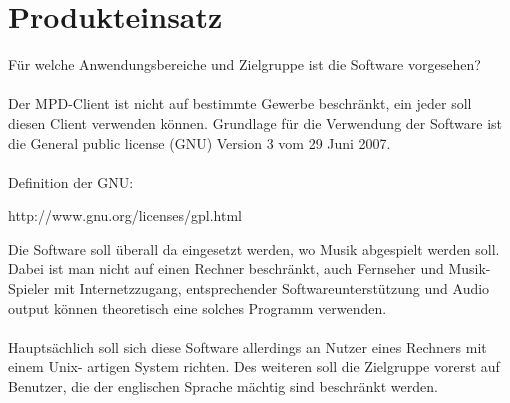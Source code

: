 \chapter{Produkteinsatz}
Für welche Anwendungsbereiche und Zielgruppe ist die Software vorgesehen?\ \\ \\
Der MPD-Client ist nicht auf bestimmte Gewerbe beschränkt, ein jeder soll diesen Client
verwenden können. Grundlage für die Verwendung der Software ist die General public license (GNU)
Version 3 vom 29 Juni 2007.\ \\ \\
Definition der GNU:
\begin{center}
http://www.gnu.org/licenses/gpl.html
\end{center}
Die Software soll überall da eingesetzt werden, wo Musik abgespielt werden
soll. Dabei ist man nicht auf einen Rechner beschränkt, auch Fernseher und Musik-Spieler mit
Internetzzugang, entsprechender Softwareunterstützung und Audio output können theoretisch eine
solches Programm verwenden.\ \\ \\
Hauptsächlich soll sich diese Software allerdings an Nutzer eines Rechners mit einem Unix-
artigen System richten. Des weiteren soll die Zielgruppe vorerst auf Benutzer, die der
englischen Sprache mächtig sind beschränkt werden.
